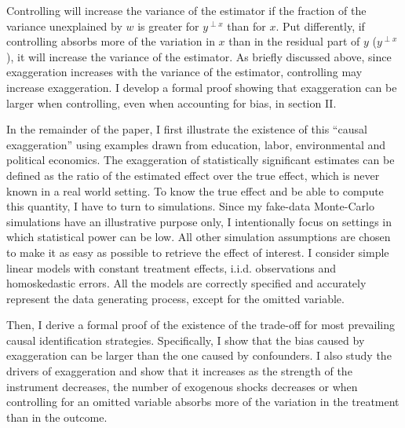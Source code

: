 			Controlling will increase the variance of the estimator if the fraction of the variance unexplained by $w$ is greater for $y^{\perp x}$ than for $x$. Put differently, if controlling absorbs more of the variation in $x$ than in the residual part of $y$ ($y^{\perp x}$), it will increase the variance of the estimator. As briefly discussed above, since exaggeration increases with the variance of the estimator, controlling may increase exaggeration. I develop a formal proof showing that exaggeration can be larger when controlling, even when accounting for bias, in section II. %
			
			In the remainder of the paper, I first illustrate the existence of this ``causal exaggeration'' using examples drawn from education, labor, environmental and political economics. %
			The exaggeration of statistically significant estimates can be defined as the ratio of the estimated effect over the true effect, which is never known in a real world setting. To know the true effect and be able to compute this quantity, I have to turn to simulations. Since my fake-data Monte-Carlo simulations have an illustrative purpose only, I intentionally focus on settings in which statistical power can be low. All other simulation assumptions are chosen to make it as easy as possible to retrieve the effect of interest. I consider simple linear models with constant treatment effects, i.i.d. observations and homoskedastic errors. All the models are correctly specified and accurately represent the data generating process, except for the omitted variable.
						
			Then, I derive a formal proof of the existence of the trade-off for most prevailing causal identification strategies. Specifically, I show that the bias caused by exaggeration can be larger than the one caused by confounders. I also study the drivers of exaggeration and show that it increases as the strength of the instrument decreases, the number of exogenous shocks decreases or when controlling for an omitted variable absorbs more of the variation in the treatment than in the outcome. 
			
